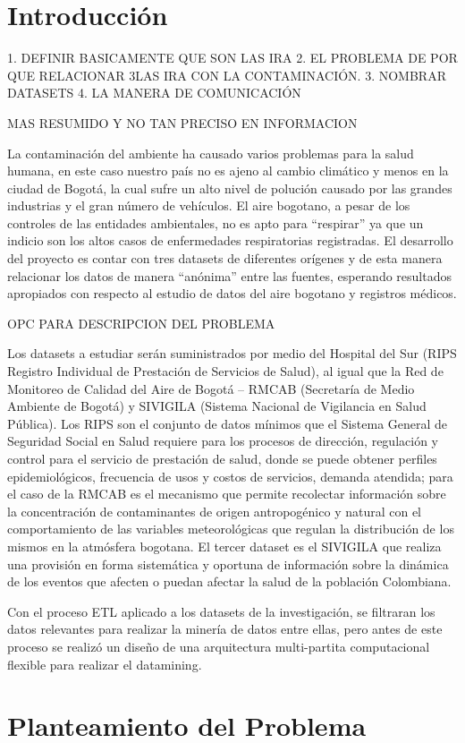 \documentclass[a4paper, 11pt, oneside]{article}
\theoremstyle{definition}
\theoremstyle{remark}
\begin{document}
\begin{center}
\begin{flushleft}
  
 \end{flushleft}
 \clearpage
 
 \section{Introducción}
 \begin{flushleft}
 1. DEFINIR BASICAMENTE QUE SON LAS IRA
 2. EL PROBLEMA DE POR QUE RELACIONAR
 3LAS IRA CON LA CONTAMINACIÓN. 
 3. NOMBRAR DATASETS
 4. LA MANERA DE COMUNICACIÓN
 
 
 MAS RESUMIDO Y NO TAN PRECISO EN INFORMACION
 

 La contaminación del ambiente ha causado varios problemas para la salud humana, en este caso nuestro país no es ajeno al cambio climático y menos en la ciudad de Bogotá, la cual sufre un alto nivel de polución causado por las grandes industrias y el gran número de vehículos. El aire bogotano, a pesar de los controles de las entidades ambientales, no es apto para “respirar” ya que un indicio son los altos casos  de enfermedades respiratorias registradas. El desarrollo del proyecto es contar con tres datasets de diferentes orígenes y de esta manera relacionar los datos de manera “anónima” entre las fuentes, esperando resultados apropiados con respecto al estudio de datos del aire bogotano y registros médicos.
 
 
 OPC PARA DESCRIPCION DEL PROBLEMA
 
Los datasets a estudiar serán suministrados por medio del Hospital del Sur (RIPS Registro Individual de Prestación de Servicios de Salud), al igual que la Red de Monitoreo de Calidad del Aire de Bogotá – RMCAB (Secretaría de Medio Ambiente de Bogotá) y SIVIGILA (Sistema Nacional de Vigilancia en Salud Pública). Los RIPS son el conjunto de datos mínimos que el Sistema General de Seguridad Social en Salud requiere para los procesos de dirección, regulación y control para el servicio de prestación de salud, donde se puede obtener perfiles epidemiológicos, frecuencia de usos y costos de servicios, demanda atendida; para el caso de la RMCAB es el mecanismo que  permite recolectar información sobre la concentración de contaminantes de origen antropogénico y natural con el comportamiento de las variables meteorológicas que regulan la distribución de los mismos en la atmósfera bogotana. El tercer dataset es el SIVIGILA  que realiza una provisión en forma sistemática y oportuna de información sobre la dinámica de los eventos que afecten o puedan afectar la salud de la población Colombiana.

Con el proceso ETL aplicado a los datasets de la investigación, se filtraran los datos relevantes para realizar la minería de datos entre ellas, pero antes de este proceso se realizó un diseño de una arquitectura multi-partita computacional flexible para realizar el datamining.

\end{flushleft}
\clearpage

 \section{Planteamiento del Problema}
\end{center}
\end{document}
